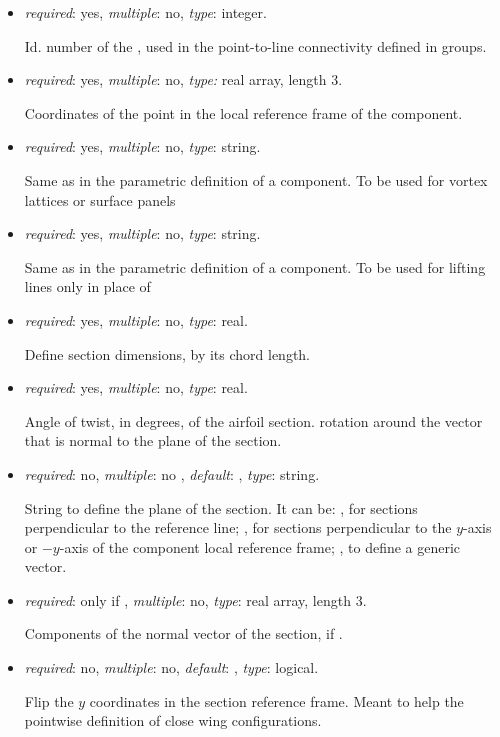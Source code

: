 \begin{itemize}

\item {} \textit{required}: yes, \textit{multiple}: no, \textit{type}: integer.

    Id. number of the , used in the point-to-line connectivity defined in  groups.

\item {}  \textit{required}: yes, \textit{multiple}: no, \textit{type:} real array, length 3.

    Coordinates of the point in the local reference frame of the component.
    
\item {}  \textit{required}: yes, \textit{multiple}: no, \textit{type}: string.

    Same as in the parametric definition of a component. To be used for vortex lattices or surface panels
    
\item {}  \textit{required}: yes, \textit{multiple}: no, \textit{type}: string.

    Same as in the parametric definition of a component. To be used for lifting lines only in place of 

\item {}  \textit{required}: yes, \textit{multiple}: no, \textit{type}: real.

    Define section dimensions, by its chord length.

\item {}  \textit{required}: yes, \textit{multiple}: no, \textit{type}: real.

    Angle of twist, in degrees, of the airfoil section. rotation around the vector that is normal to the plane of the section.

\item {} \textit{required}: no, \textit{multiple}: no , \textit{default}:  , \textit{type}: string.

    String to define the plane of the section. It can be: , for sections perpendicular to the reference line; ,  for sections perpendicular to the $y$-axis or $-y$-axis of the component local reference frame; , to define a generic vector. 

\item {} \textit{required}: only if , \textit{multiple}: no, \textit{type}: real array, length 3.

    Components of the normal vector of the section, if .

\item {} \textit{required}: no, \textit{multiple}: no, \textit{default}:  , \textit{type}: logical.

   Flip the $y$ coordinates in the section reference frame. Meant to help the pointwise definition of close wing configurations.

\end{itemize}
